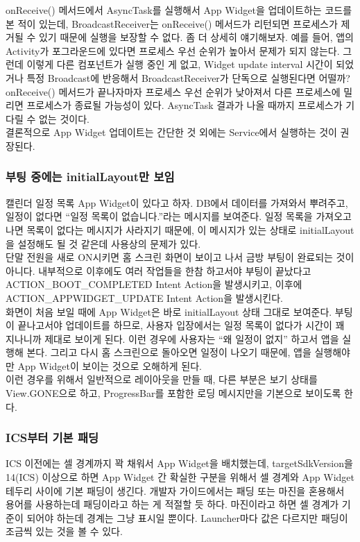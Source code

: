 onReceive() 메서드에서 AsyncTask를 실행해서 App Widget을 업데이트하는 코드를 본 적이 있는데, BroadcastReceiver는 onReceive() 메서드가 리턴되면 프로세스가 제거될 수 있기 때문에 실행을 보장할 수 없다.
좀 더 상세히 얘기해보자. 예를 들어, 앱의 Activity가 포그라운드에 있다면 프로세스 우선 순위가 높아서 문제가 되지 않는다. 그런데 이렇게 다른 컴포넌트가 실행 중인 게 없고, Widget update interval 시간이 되었거나 특정 Broadcast에 반응해서 BroadcastReceiver가 단독으로 실행된다면 어떨까? 
onReceive() 메서드가 끝나자마자 프로세스 우선 순위가 낮아져서 다른 프로세스에 밀리면 프로세스가 종료될 가능성이 있다. AsyncTask 결과가 나올 때까지 프로세스가 기다릴 수 없는 것이다.\\

결론적으로 App Widget 업데이트는 간단한 것 외에는 Service에서 실행하는 것이 권장된다. 

\subsubsection{부팅 중에는 initialLayout만 보임}
캘린더 일정 목록 App Widget이 있다고 하자. 
DB에서 데이터를 가져와서 뿌려주고, 일정이 없다면 ``일정 목록이 없습니다.''라는 메시지를 보여준다.
일정 목록을 가져오고나면 목록이 없다는 메시지가 사라지기 때문에, 이 메시지가 있는 상태로 initialLayout을 설정해도 될 것 같은데 사용상의 문제가 있다.\\

단말 전원을 새로 ON시키면 홈 스크린 화면이 보이고 나서 금방 부팅이 완료되는 것이 아니다. 
내부적으로 이후에도 여러 작업들을 한참 하고서야 부팅이 끝났다고 ACTION\_BOOT\_COMPLETED Intent Action을 발생시키고, 이후에 ACTION\_APPWIDGET\_UPDATE Intent Action을 발생시킨다.\\

화면이 처음 보일 때에 App Widget은 바로 initialLayout 상태 그대로 보여준다. 부팅이 끝나고서야 업데이트를 하므로, 사용자 입장에서는 일정 목록이 없다가 시간이 꽤 지나니까 제대로 보이게 된다.
이런 경우에 사용자는 ``왜 일정이 없지'' 하고서 앱을 실행해 본다. 그리고 다시 홈 스크린으로 돌아오면 일정이 나오기 때문에, 앱을 실행해야만 App Widget이 보이는 것으로 오해하게 된다.\\

이런 경우를 위해서 일반적으로 레이아웃을 만들 때, 다른 부분은 보기 상태를 View.GONE으로 하고, ProgressBar를 포함한 로딩 메시지만을 기본으로 보이도록 한다.

\subsubsection{ICS부터 기본 패딩}
\label{subsubsec:icspadding}
ICS 이전에는 셀 경계까지 꽉 채워서 App Widget을 배치했는데, targetSdkVersion을 14(ICS) 이상으로 하면 App Widget 간 확실한 구분을 위해서 셀 경계와 App Widget 테두리 사이에 기본 패딩이 생긴다. 개발자 가이드에서는 패딩 또는 마진을 혼용해서 용어를 사용하는데 패딩이라고 하는 게 적절할 듯 하다. 마진이라고 하면 셀 경계가 기준이 되어야 하는데 경계는 그냥 표시일 뿐이다. Launcher마다 값은 다르지만 패딩이 조금씩 있는 것을 볼 수 있다.\\


